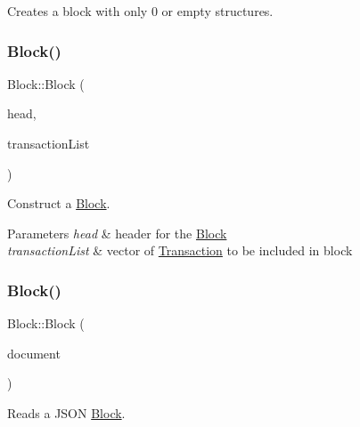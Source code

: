 Creates a block with only 0 or empty structures. 

\mbox{\label{classBlock_a3490153019c72834ce07382dcecfde86}} 
\subsubsection{\texorpdfstring{Block()}{Block()}\hspace{0.1cm}{\footnotesize\ttfamily [2/3]}}
{\footnotesize\ttfamily Block\+::\+Block (\begin{DoxyParamCaption}\item[{\mbox{\hyperlink{structBlockHeader}{Block\+Header}}}]{head,  }\item[{std\+::vector$<$ std\+::shared\+\_\+ptr$<$ \mbox{\hyperlink{classTransaction}{Transaction}} $>$ $>$}]{transaction\+List }\end{DoxyParamCaption})}



Construct a \mbox{\hyperlink{classBlock}{Block}}. 


\begin{DoxyParams}{Parameters}
{\em head} & header for the \mbox{\hyperlink{classBlock}{Block}} \\
\hline
{\em transaction\+List} & vector of \mbox{\hyperlink{classTransaction}{Transaction}} to be included in block \\
\hline
\end{DoxyParams}
\mbox{\label{classBlock_ae5c87aaeaf73bf298df7fc24753f7029}} 
\subsubsection{\texorpdfstring{Block()}{Block()}\hspace{0.1cm}{\footnotesize\ttfamily [3/3]}}
{\footnotesize\ttfamily Block\+::\+Block (\begin{DoxyParamCaption}\item[{rapidjson\+::\+Document $\ast$}]{document }\end{DoxyParamCaption})\hspace{0.3cm}{\ttfamily [explicit]}}



Reads a J\+S\+ON \mbox{\hyperlink{classBlock}{Block}}. 


